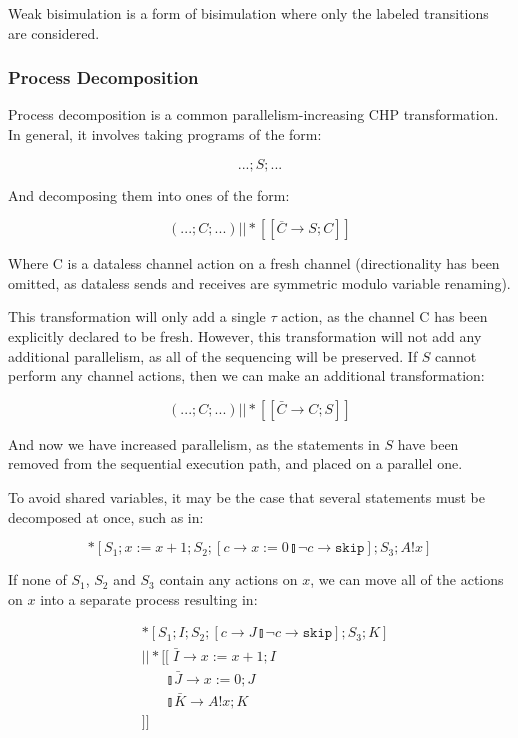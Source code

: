 \documentclass[times, 10pt]{article}
\begin{document}
Weak bisimulation is a form of bisimulation where only the labeled transitions
are considered.

\subsubsection{Process Decomposition}

Process decomposition is a common parallelism-increasing CHP transformation.  In
general, it involves taking programs of the form:

\[
...;S;...
\]

And decomposing them into ones of the form:

\[
(...;C;...) || *[[\overline{C} \rightarrow S; C]]
\]

Where C is a dataless channel action on a fresh channel (directionality has been
omitted, as dataless sends and receives are symmetric modulo variable renaming).

This transformation will only add a single $\tau$ action, as the channel C has
been explicitly declared to be fresh.  However, this transformation will not
add any additional parallelism, as all of the sequencing will be preserved. If
$S$ cannot perform any channel actions, then we can make an additional
transformation:

\[
(...;C;...) || *[[\bar{C} \rightarrow C; S]]
\]

And now we have increased parallelism, as the statements in $S$ have been
removed from the sequential execution path, and placed on a parallel one.

To avoid shared variables, it may be the case that several statements must be
decomposed at once, such as in:

\[
*[S_1; x := x + 1; S_2; [ c \rightarrow x := 0 \talloblong \lnot c \rightarrow \texttt{skip} ]; S_3; A!x ] 
\]

If none of $S_1$, $S_2$ and $S_3$ contain any actions on $x$, we can
move all of the actions on $x$ into a separate process resulting in:

\begin{align*}
& *[S_1; I; S_2; [ c \rightarrow J \talloblong \lnot c \rightarrow \texttt{skip} ]; S_3; K] \\
& || *[[\;\bar{I} \rightarrow x := x + 1; I \\
&\;\;\;\;\;\;\talloblong \bar{J} \rightarrow x := 0; J \\
&\;\;\;\;\;\;\talloblong \bar{K} \rightarrow  A!x; K \\
&]]
\end{align*}
\end{document}
